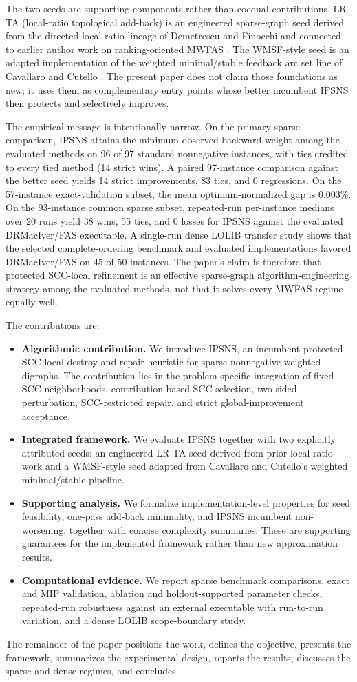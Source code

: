 The two seeds are supporting components rather than coequal contributions. LR-TA (local-ratio topological add-back) is an engineered sparse-graph seed derived from the directed local-ratio lineage of Demetrescu and Finocchi \cite{DF03} and connected to earlier author work on ranking-oriented MWFAS \cite{VahidiKoutis2024arxiv}. The WMSF-style seed is an adapted implementation of the weighted minimal/stable feedback arc set line of Cavallaro and Cutello \cite{CC25}. The present paper does not claim those foundations as new; it uses them as complementary entry points whose better incumbent IPSNS then protects and selectively improves.

The empirical message is intentionally narrow. On the primary sparse comparison, IPSNS attains the minimum observed backward weight among the evaluated methods on 96 of 97 standard nonnegative instances, with ties credited to every tied method (14 strict wins). A paired 97-instance comparison against the better seed yields 14 strict improvements, 83 ties, and 0 regressions. On the 57-instance exact-validation subset, the mean optimum-normalized gap is 0.003\%. On the 93-instance common sparse subset, repeated-run per-instance medians over 20 runs yield 38 wins, 55 ties, and 0 losses for IPSNS against the evaluated DRMacIver/FAS executable. A single-run dense LOLIB transfer study shows that the selected complete-ordering benchmark and evaluated implementations favored DRMacIver/FAS on 45 of 50 instances. The paper's claim is therefore that protected SCC-local refinement is an effective sparse-graph algorithm-engineering strategy among the evaluated methods, not that it solves every MWFAS regime equally well.

The contributions are:
\begin{itemize}
    \item \textbf{Algorithmic contribution.} We introduce IPSNS, an incumbent-protected SCC-local destroy-and-repair heuristic for sparse nonnegative weighted digraphs. The contribution lies in the problem-specific integration of fixed SCC neighborhoods, contribution-based SCC selection, two-sided perturbation, SCC-restricted repair, and strict global-improvement acceptance.
    \item \textbf{Integrated framework.} We evaluate IPSNS together with two explicitly attributed seeds: an engineered LR-TA seed derived from prior local-ratio work and a WMSF-style seed adapted from Cavallaro and Cutello's weighted minimal/stable pipeline.
    \item \textbf{Supporting analysis.} We formalize implementation-level properties for seed feasibility, one-pass add-back minimality, and IPSNS incumbent non-worsening, together with concise complexity summaries. These are supporting guarantees for the implemented framework rather than new approximation results.
    \item \textbf{Computational evidence.} We report sparse benchmark comparisons, exact and MIP validation, ablation and holdout-supported parameter checks, repeated-run robustness against an external executable with run-to-run variation, and a dense LOLIB scope-boundary study.
\end{itemize}

The remainder of the paper positions the work, defines the objective, presents the framework, summarizes the experimental design, reports the results, discusses the sparse and dense regimes, and concludes.
